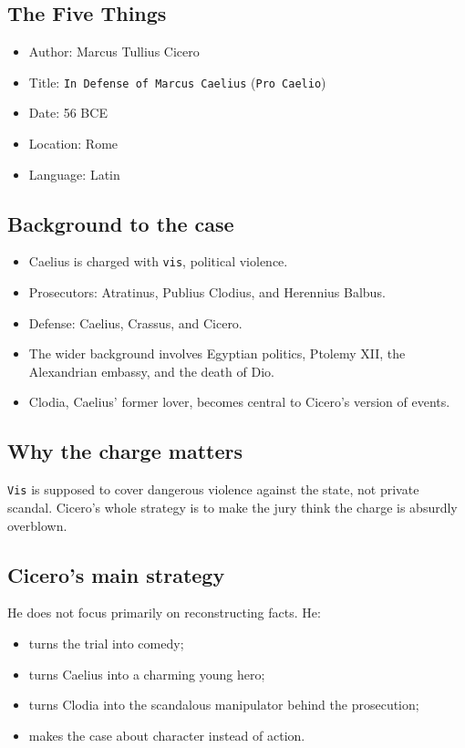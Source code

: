 \documentclass[11pt]{article}
\begin{document}
\subsection{The Five Things}

\begin{itemize}
\item Author: Marcus Tullius Cicero
\item Title: \texttt{In Defense of Marcus Caelius} (\texttt{Pro Caelio})
\item Date: 56 BCE
\item Location: Rome
\item Language: Latin
\end{itemize}

\subsection{Background to the case}

\begin{itemize}
\item Caelius is charged with \texttt{vis}, political violence.
\item Prosecutors: Atratinus, Publius Clodius, and Herennius Balbus.
\item Defense: Caelius, Crassus, and Cicero.
\item The wider background involves Egyptian politics, Ptolemy XII, the Alexandrian embassy, and the death of Dio.
\item Clodia, Caelius' former lover, becomes central to Cicero's version of events.
\end{itemize}

\subsection{Why the charge matters}

\texttt{Vis} is supposed to cover dangerous violence against the state, not private scandal. Cicero's whole strategy is to make the jury think the charge is absurdly overblown.

\subsection{Cicero's main strategy}

He does not focus primarily on reconstructing facts. He:

\begin{itemize}
\item turns the trial into comedy;
\item turns Caelius into a charming young hero;
\item turns Clodia into the scandalous manipulator behind the prosecution;
\item makes the case about character instead of action.
\end{itemize}
\end{document}
